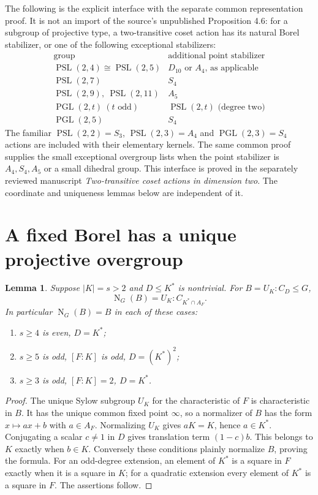 \documentclass[11pt]{article}
\newtheorem{lemma}{Lemma}\newtheorem{theorem}[lemma]{Theorem}
\newcommand{\PSL}{\operatorname{PSL}}\newcommand{\PGL}{\operatorname{PGL}}
\newcommand{\N}{\operatorname{N}}\newcommand{\F}{\mathbb F}
\begin{document}
The following is the explicit interface with the separate common
representation proof. It is not an import of the source's unpublished
Proposition 4.6: for a subgroup of projective type, a two-transitive
coset action has its natural Borel stabilizer, or one of the following
exceptional stabilizers:
\[
\begin{array}{c|c}
\text{group}&\text{additional point stabilizer}\\\hline
\PSL(2,4)\cong\PSL(2,5)&D_{10}\text{ or }A_4\text{, as applicable}\\
\PSL(2,7)&S_4\\
\PSL(2,9),\ \PSL(2,11)&A_5\\
\PGL(2,t)\ (t\text{ odd})&\PSL(2,t)\text{ (degree two)}\\
\PGL(2,5)&S_4
\end{array}
\]
The familiar $\PSL(2,2)=S_3$, $\PSL(2,3)=A_4$ and
$\PGL(2,3)=S_4$ actions are included with their elementary kernels.
The same common proof supplies the small exceptional overgroup lists
when the point stabilizer is $A_4,S_4,A_5$ or a small dihedral group.
This interface is proved in the separately reviewed manuscript
\emph{Two-transitive coset actions in dimension two}.
The coordinate and uniqueness lemmas below are independent of it.

\section{A fixed Borel has a unique projective overgroup}
\begin{lemma}\label{normalizer}
Suppose $|K|=s>2$ and $D\le K^*$ is nontrivial. For
$B=U_K:C_D\le G$,
\[
 \N_G(B)=U_K:C_{K^*\cap A_F}.
\]
In particular $\N_G(B)=B$ in each of these cases:
\begin{enumerate}
\item $s\ge4$ is even, $D=K^*$;
\item $s\ge5$ is odd, $[F:K]$ is odd, $D=(K^*)^2$;
\item $s\ge3$ is odd, $[F:K]=2$, $D=K^*$.
\end{enumerate}
\end{lemma}
\begin{proof}
The unique Sylow subgroup $U_K$ for the characteristic of $F$ is
characteristic in $B$. It has the unique common fixed point $\infty$,
so a normalizer of $B$ has the form $x\mapsto ax+b$ with
$a\in A_F$. Normalizing $U_K$ gives $aK=K$, hence $a\in K^*$.
Conjugating a scalar $c\ne1$ in $D$ gives translation term
$(1-c)b$. This belongs to $K$ exactly when $b\in K$. Conversely
these conditions plainly normalize $B$, proving the formula.
For an odd-degree extension, an element of $K^*$ is a square in
$F$ exactly when it is a square in $K$; for a quadratic extension
every element of $K^*$ is a square in $F$. The assertions follow.
\end{proof}
\end{document}
